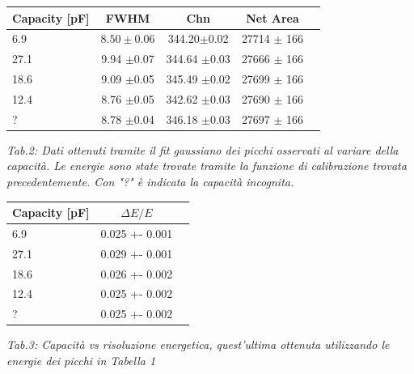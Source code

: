 \documentclass[a4paper]{article}
\begin{document}
\begin{center} 
		
		\begin{tabular}{lcccc}
			\hline
			\hline
			\textbf{Capacity} [pF]   &     \textbf{FWHM}         	&  \textbf{Chn}              &     \textbf{Net Area}    	 \\
			\hline
			\hline
				       6.9                      & $8.50\pm0.06$  			&       344.20$\pm$0.02			        	&	27714 $\pm$ 166						\\
				       27.1                   &  9.94 $\pm$0.07			&        344.64  $\pm$0.03  				  	&	27666 $\pm$ 166			  			\\
				       18.6		        &  9.09 $\pm$0.05				&       345.49  $\pm$0.02 			             & 	27699 $\pm$ 166			 			\\
				       12.4		        & 8.76 	$\pm$0.05		&        342.62  $\pm$0.03  			       	& 	27690 $\pm$ 166						\\
			    		?			& 8.78	$\pm$0.04		&	  346.18	$\pm$0.03		      	&	27697 $\pm$ 166							\\
			\hline
			\hline
		\end{tabular}
		\linebreak
		\emph{Tab.2: Dati ottenuti tramite il fit gaussiano dei picchi osservati al variare della capacità. Le energie sono state trovate tramite la funzione di calibrazione trovata precedentemente. Con "?" è indicata la capacità incognita.} 
	\end{center}
	
\begin{center} 
		
		\begin{tabular}{lcc}
			\hline
			\hline
			\textbf{Capacity} [pF]   &     \textbf{$\Delta E/E$} 	 \\
			\hline
			\hline
				       6.9              &	0.025 +- 0.001 \\
				       27.1             &	0.029 +- 0.001  \\
				       18.6		        &	0.026 +- 0.002 \\
				       12.4		        & 	0.025 +- 0.002  \\
			    		?			    &  	0.025 +- 0.002 \\
			\hline
			\hline
		\end{tabular}
		\linebreak
		\emph{Tab.3: Capacità vs risoluzione energetica, quest'ultima ottenuta utilizzando le energie dei picchi in Tabella 1} 
	\end{center} 	
	
\end{document}

